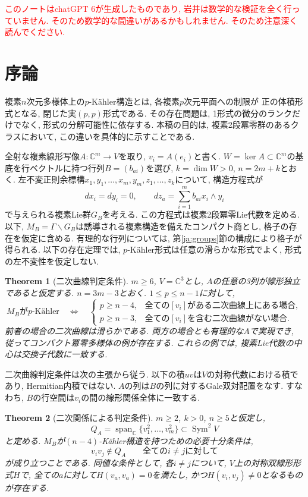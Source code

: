 \documentclass[12pt]{amsart}
\newcommand{\thmword}{Theorem}
\newtheorem{thm}{\thmword}[section]
\theoremstyle{definition}
\theoremstyle{remark}
\numberwithin{equation}{section}
\DeclareMathOperator{\Sym}{Sym}
\newcommand{\C}{\mathbb{C}}
\newcommand{\xr}[1]{\textcolor{red}{#1}}
\begin{document}
\xr{このノートはchatGPT 6が生成したものであり, 岩井は数学的な検証を全く行っていません. そのため数学的な間違いがあるかもしれません. そのため注意深く読んでください.}


\section{序論}
複素$n$次元多様体上の$p$-K\"ahler構造とは, 各複素$p$次元平面への制限が
正の体積形式となる, 閉じた実$(p,p)$形式である.
その存在問題は, 1形式の微分のランクだけでなく, 形式の分解可能性に依存する.
本稿の目的は, 複素2段冪零群のあるクラスにおいて, この違いを具体的に示すことである.

全射な複素線形写像$A:\C^m\longrightarrow V$を取り, $v_i=A(e_i)$と書く.
$W=\ker A\subset\C^m$の基底を行ベクトルに持つ行列$B=(b_{ai})$を選び,
$k=\dim W>0$, $n=2m+k$とおく.
左不変正則余標構$x_1,y_1,\ldots,x_m,y_m,z_1,\ldots,z_k$について,
構造方程式が
\begin{equation}\label{ja:structure}
 dx_i=dy_i=0,\qquad dz_a=\sum_{i=1}^m b_{ai}x_i\wedge y_i
\end{equation}
で与えられる複素Lie群$G_B$を考える.
この方程式は複素2段冪零Lie代数を定める.
以下, $M_B=\Gamma\backslash G_B$は誘導される複素構造を備えたコンパクト商とし,
格子の存在を仮定に含める. 有理的な行列については,
第\ref{ja:groups}節の構成により格子が得られる.
以下の存在定理では, $p$-K\"ahler形式は任意の滑らかな形式でよく,
形式の左不変性を仮定しない.

\begin{thm}[二次曲線判定条件]\label{ja:conic}
$m\geq6$, $V=\C^3$とし, $A$の任意の3列が線形独立であると仮定する.
$n=3m-3$とおく. $1\leq p\leq n-1$に対して,
\[
 M_B\text{が}p\text{-K\"ahler}
 \quad\Longleftrightarrow\quad
 \begin{cases}
 p\geq n-4,&\text{全ての}[v_i]\text{がある二次曲線上にある場合},\\
 p\geq n-3,&\text{全ての}[v_i]\text{を含む二次曲線がない場合}.
 \end{cases}
\]
前者の場合の二次曲線は滑らかである. 両方の場合とも有理的な$A$で実現でき,
従ってコンパクト冪零多様体の例が存在する.
これらの例では, 複素Lie代数の中心は交換子代数に一致する.
\end{thm}

二次曲線判定条件は次の主張から従う.
以下の積$uv$は$V$の対称代数における積であり, Hermitian内積ではない.
$A$の列は$B$の列に対するGale双対配置をなす.
すなわち, $B$の行空間は$v_i$の間の線形関係全体に一致する.

\begin{thm}[二次関係による判定条件]\label{ja:quadratic}
$m\geq2$, $k>0$, $n\geq5$と仮定し,
\[
 Q_A=\operatorname{span}_{\C}\{v_1^2,\ldots,v_m^2\}
       \subset\Sym^2 V
\]
と定める. $M_B$が$(n-4)$-K\"ahler構造を持つための必要十分条件は,
\begin{equation}\label{ja:quadratic-test}
 v_i v_j\notin Q_A\qquad\text{全ての}i\ne j\text{に対して}
\end{equation}
が成り立つことである.
同値な条件として, 各$i\ne j$について, $V$上の対称双線形形式$H$で,
全ての$a$に対して$H(v_a,v_a)=0$を満たし, かつ$H(v_i,v_j)\ne0$となるものが存在する.
\end{thm}
\end{document}
